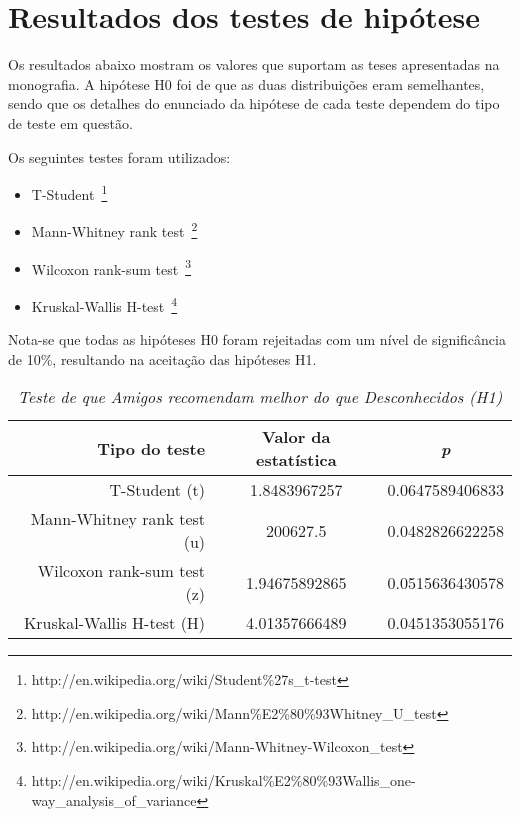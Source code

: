 \appendix
\chapter{Resultados dos testes de hipótese}
\label{anexo_hipoteses}

Os resultados abaixo mostram os valores que suportam as teses apresentadas na monografia. A hipótese H0 foi de que as duas distribuições eram semelhantes, sendo que os detalhes do enunciado da hipótese de cada teste dependem do tipo de teste em questão.

Os seguintes testes foram utilizados:

\begin{itemize}
    \item T-Student~\footnote{http://en.wikipedia.org/wiki/Student\%27s\_t-test}
    \item Mann-Whitney rank test~\footnote{http://en.wikipedia.org/wiki/Mann\%E2\%80\%93Whitney\_U\_test}
    \item Wilcoxon rank-sum test~\footnote{http://en.wikipedia.org/wiki/Mann-Whitney-Wilcoxon\_test}
    \item Kruskal-Wallis H-test~\footnote{http://en.wikipedia.org/wiki/Kruskal\%E2\%80\%93Wallis\_one-way\_analysis\_of\_variance}

\end{itemize}

Nota-se que todas as hipóteses H0 foram rejeitadas com um nível de significância de 10\%, resultando na aceitação das hipóteses H1.

\begin{table}
\centering
\begin{tabular}{|r|c|c|}
    \hline
    \textbf{Tipo do teste} & \textbf{Valor da estatística} & \textbf{\textit{p}} \\
    \hline
T-Student (t) & 1.8483967257 & 0.0647589406833 \\
\hline 
Mann-Whitney rank test (u) & 200627.5 & 0.0482826622258 \\
\hline 
Wilcoxon rank-sum test (z) & 1.94675892865 & 0.0515636430578 \\
\hline 
Kruskal-Wallis H-test (H) & 4.01357666489 & 0.0451353055176 \\
\hline 

\end{tabular}
\caption{\it Teste de que Amigos recomendam melhor do que Desconhecidos (H1)}
\end{table}


